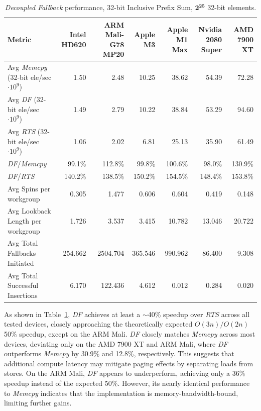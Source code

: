 \documentclass[acmsmall, manuscript, screen, review, anonymous]{acmart}
\begin{document}
\begin{table}
  \centering
  \small
  \setlength{\tabcolsep}{1pt}
  \begin{tabular*}{\textwidth}{@{\extracolsep{\fill}} l r r r r r r}
    \toprule
    Metric & \!\!\!\!\!\!Intel HD620 & ARM Mali-G78 MP20 & Apple M3 & Apple M1 Max & Nvidia 2080 Super & AMD 7900 XT \\
    \midrule
    Avg \emph{Memcpy} (32-bit ele/sec $\cdot 10^9$)  & 1.50   & 2.48  & 10.25  & 38.62  & 54.39  & 72.28  \\
    Avg \emph{DF} (32-bit ele/sec $\cdot 10^9$)   & 1.49   & 2.79  & 10.22  & 38.84  & 53.29  & 94.60  \\
    Avg \emph{RTS} (32-bit ele/sec $\cdot 10^9$)      & 1.06   & 2.02  & 6.81   & 25.13  & 35.90  & 61.49  \\
    \emph{DF}/\emph{Memcpy}       & 99.1\%    & 112.8\%  & 99.8\%    & 100.6\%   & 98.0\%    & 130.9\%   \\
    \emph{DF}/\emph{RTS}          & 140.2\%   & 138.5\%  & 150.2\%   & 154.5\%   & 148.4\%   & 153.8\%   \\
    Avg Spins per workgroup    & 0.305    & 1.477    & 0.606    & 0.604    & 0.419    & 0.148    \\
    Avg Lookback Length per workgroup& 1.726    & 3.537    & 3.415    & 10.782   & 13.046   & 20.722   \\
    Avg Total Fallbacks Initiated      & 254.662   & 2504.704  & 365.546   & 990.962   & 86.400   & 9.308   \\
    Avg Total Successful Insertions    & 6.170     & 122.436   & 4.612     & 0.012    & 0.284    & 0.020    \\
    \bottomrule
  \end{tabular*}
  \caption{\emph{Decoupled Fallback} performance, 32-bit Inclusive Prefix Sum, $\mathbf{2^{25}}$ 32-bit elements.\label{tab:results}}
\end{table}

As shown in Table~\ref{tab:results}, \emph{DF} achieves at least a $\sim$40\% speedup over \emph{RTS} across all tested devices, closely approaching the theoretically expected $O(3n)/O(2n)$ 50\% speedup, except on the ARM Mali. \emph{DF} closely matches \emph{Memcpy} across most devices, deviating only on the AMD 7900 XT and ARM Mali, where \emph{DF} outperforms \emph{Memcpy} by 30.9\% and 12.8\%, respectively. This suggests that additional compute latency may mitigate paging effects by separating loads from stores. On the ARM Mali, \emph{DF} appears to underperform, achieving only a 36\% speedup instead of the expected 50\%. However, its nearly identical performance to \emph{Memcpy} indicates that the implementation is memory-bandwidth-bound, limiting further gains.
\end{document}

